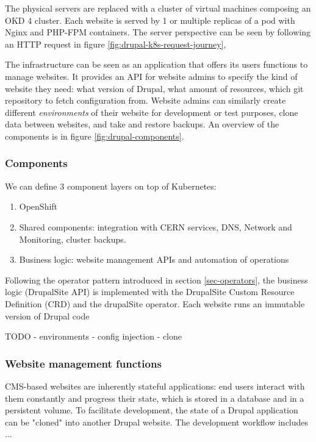 The physical servers are replaced with a cluster of virtual machines composing an OKD 4 cluster.
Each website is served by 1 or multiple replicas of a pod with Nginx and PHP-FPM containers.
The server perspective can be seen by following an HTTP request in figure \ref{fig:drupal-k8s-request-journey},

The infrastructure can be seen as an application that offers its users functions to manage websites.
It provides an API for website admins to specify the kind of website they need: what version of Drupal, what amount of resources, which git repository to fetch configuration from.
Website admins can similarly create different \emph{environments} of their website for development or test purposes,
clone data between websites, and take and restore backups.
An overview of the components is in figure \ref{fig:drupal-components}.

\subsubsection{Components}

We can define 3 component layers on top of Kubernetes:
\begin{enumerate}
    \item OpenShift
    \item Shared components: integration with CERN services, DNS, Network and Monitoring, cluster backups.
    \item Business logic: website management APIs and automation of operations
\end{enumerate}

Following the operator pattern introduced in section \ref{sec-operators}, the business logic (DrupalSite API) is implemented with the DrupalSite Custom Resource Definition (CRD) and the drupalSite operator.
Each website runs an immutable version of Drupal code

TODO
- environments
- config injection
- clone






\subsubsection*{Website management functions}


CMS-based websites are inherently stateful applications: end users interact with them constantly and progress their state,
which is stored in a database and in a persistent volume.
To facilitate development, the state of a Drupal application can be "cloned" into another Drupal website.
The development workflow includes ... %

